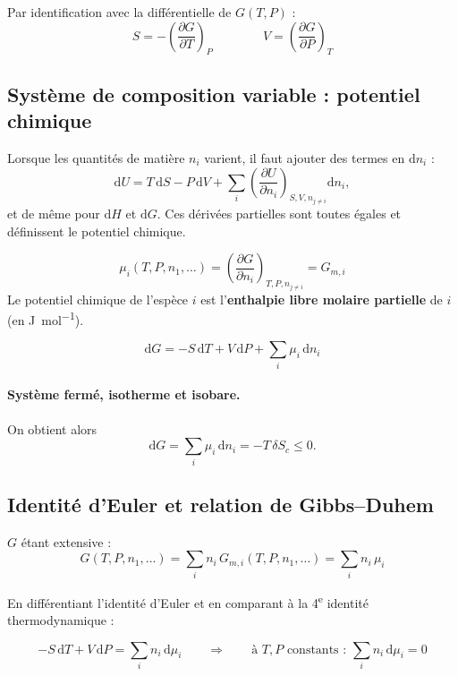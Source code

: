 \documentclass[11pt,a4paper]{article}
\newcommand{\dd}{\mathrm{d}}
\newcommand{\pd}[3]{\left(\frac{\partial #1}{\partial #2}\right)_{#3}}
\begin{document}
\begin{resultat}[title={Conséquences}]
Par identification avec la différentielle de $G(T,P)$ :
\[
  S = -\pd{G}{T}{P}
  \qquad\qquad
  V = \pd{G}{P}{T}
\]
\end{resultat}

\subsection{Système de composition variable : potentiel chimique}

Lorsque les quantités de matière $n_i$ varient, il faut ajouter des termes
en $\dd n_i$ :
\[
  \dd U = T\,\dd S - P\,\dd V + \sum_i \pd{U}{n_i}{S,V,n_{j\neq i}} \dd n_i ,
\]
et de même pour $\dd H$ et $\dd G$. Ces dérivées partielles sont toutes égales
et définissent le potentiel chimique.

\begin{definition}[title={Potentiel chimique}]
\[
  \mu_i(T,P,n_1,\dots) = \pd{G}{n_i}{T,P,n_{j\neq i}} = G_{m,i}
\]
Le potentiel chimique de l'espèce $i$ est l'\textbf{enthalpie libre molaire
partielle} de $i$ (en \si{\joule\per\mole}).
\end{definition}

\begin{resultat}[title={Quatrième identité thermodynamique}]
\[
  \dd G = -S\,\dd T + V\,\dd P + \sum_i \mu_i\,\dd n_i
\]
\end{resultat}

\paragraph{Système fermé, isotherme et isobare.}
On obtient alors
\[
  \dd G = \sum_i \mu_i\,\dd n_i = -T\,\delta S_c \le 0 .
\]

\subsection{Identité d'Euler et relation de Gibbs--Duhem}

\begin{resultat}[title={Identité d'Euler}]
$G$ étant extensive :
\[
  G(T,P,n_1,\dots) = \sum_i n_i\, G_{m,i}(T,P,n_1,\dots) = \sum_i n_i\,\mu_i
\]
\end{resultat}

En différentiant l'identité d'Euler et en comparant à la 4\textsuperscript{e}
identité thermodynamique :

\begin{resultat}[title={Relation de Gibbs--Duhem}]
\[
  -S\,\dd T + V\,\dd P = \sum_i n_i\,\dd\mu_i
  \qquad\Longrightarrow\qquad
  \text{à } T,P \text{ constants : } \sum_i n_i\,\dd\mu_i = 0
\]
\end{resultat}
\end{document}
